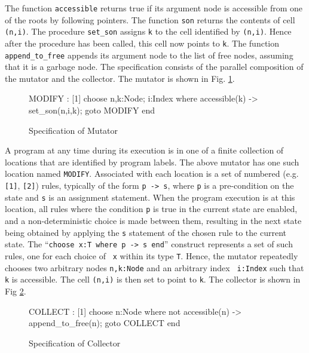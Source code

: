 The  function {\tt accessible} returns  true if  its argument node is
accessible from one of the roots by  following pointers.  The function
{\tt son} returns  the contents of  cell  {\tt (n,i)}\@.  The  procedure
{\tt set\_son} assigns {\tt k} to the cell identified  by {\tt (n,i)}\@. 
Hence after the  procedure has been called,   this cell now points  to
{\tt k}\@.  The function {\tt   append\_to\_free} appends its  argument
node to the list  of free nodes,  assuming that it is  a garbage node. 
The specification consists of  the parallel composition of the mutator
and   the     collector.    The  mutator is shown in Fig. \ref{spec-mutator}.

\begin{figure}[htb]
\begin{smallsession}
  MODIFY : 
    [1] choose n,k:Node; i:Index where accessible(k) -> 
          set_son(n,i,k); 
          goto MODIFY
        end
\end{smallsession}
\caption{Specification of Mutator}
\label{spec-mutator}
\end{figure}

A program at  any time during   its execution is  in  one of a  finite
collection of locations  that are identified  by program  labels.  The
above mutator has one such location named  {\tt MODIFY}\@.  Associated
with  each location is  a set of  numbered (e.g. {\tt [1]}, {\tt [2]})
rules,    typically of the form   {\tt  p -> s},   where  {\tt p} is a
pre-condition on the  state and  {\tt s}  is an assignment  statement. 
When the program  execution is at this  location, all rules where  the
condition  {\tt p}  is true  in the  current state are  enabled, and a
non-deterministic choice is  made between them,  resulting in the next
state being obtained  by applying the {\tt s}  statement of the chosen
rule to the current state.  The ``{\tt choose x:T where  p -> s end}''
construct represents a set of such rules,  one for each choice of {\tt
  x} within its type {\tt T}\@.  Hence, the mutator repeatedly chooses
two   arbitrary  nodes {\tt  n,k:Node}   and  an arbitrary index  {\tt
  i:Index} such that {\tt  k} is accessible.  The  cell {\tt (n,i)} is
then set to point to {\tt k}\@.  The collector is shown in Fig \ref{spec-collector}.

\begin{figure}[htb]
\begin{smallsession}
  COLLECT :
    [1] choose n:Node where not accessible(n) -> 
          append_to_free(n); 
          goto COLLECT
        end
\end{smallsession}
\caption{Specification of Collector}
\label{spec-collector}
\end{figure}

